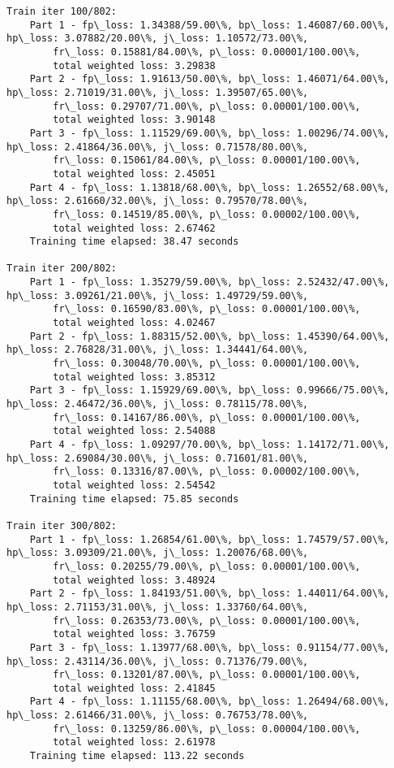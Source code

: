 \documentclass[11pt]{article}
\begin{document}
\begin{Verbatim}[commandchars=\\\{\}]
Train iter 100/802:
	Part 1 - fp\_loss: 1.34388/59.00\%, bp\_loss: 1.46087/60.00\%, hp\_loss: 3.07882/20.00\%, j\_loss: 1.10572/73.00\%, 
		fr\_loss: 0.15881/84.00\%, p\_loss: 0.00001/100.00\%, 
		total weighted loss: 3.29838
	Part 2 - fp\_loss: 1.91613/50.00\%, bp\_loss: 1.46071/64.00\%, hp\_loss: 2.71019/31.00\%, j\_loss: 1.39507/65.00\%, 
		fr\_loss: 0.29707/71.00\%, p\_loss: 0.00001/100.00\%, 
		total weighted loss: 3.90148
	Part 3 - fp\_loss: 1.11529/69.00\%, bp\_loss: 1.00296/74.00\%, hp\_loss: 2.41864/36.00\%, j\_loss: 0.71578/80.00\%, 
		fr\_loss: 0.15061/84.00\%, p\_loss: 0.00001/100.00\%, 
		total weighted loss: 2.45051
	Part 4 - fp\_loss: 1.13818/68.00\%, bp\_loss: 1.26552/68.00\%, hp\_loss: 2.61660/32.00\%, j\_loss: 0.79570/78.00\%, 
		fr\_loss: 0.14519/85.00\%, p\_loss: 0.00002/100.00\%, 
		total weighted loss: 2.67462
	Training time elapsed: 38.47 seconds

Train iter 200/802:
	Part 1 - fp\_loss: 1.35279/59.00\%, bp\_loss: 2.52432/47.00\%, hp\_loss: 3.09261/21.00\%, j\_loss: 1.49729/59.00\%, 
		fr\_loss: 0.16590/83.00\%, p\_loss: 0.00001/100.00\%, 
		total weighted loss: 4.02467
	Part 2 - fp\_loss: 1.88315/52.00\%, bp\_loss: 1.45390/64.00\%, hp\_loss: 2.76828/31.00\%, j\_loss: 1.34441/64.00\%, 
		fr\_loss: 0.30048/70.00\%, p\_loss: 0.00001/100.00\%, 
		total weighted loss: 3.85312
	Part 3 - fp\_loss: 1.15929/69.00\%, bp\_loss: 0.99666/75.00\%, hp\_loss: 2.46472/36.00\%, j\_loss: 0.78115/78.00\%, 
		fr\_loss: 0.14167/86.00\%, p\_loss: 0.00001/100.00\%, 
		total weighted loss: 2.54088
	Part 4 - fp\_loss: 1.09297/70.00\%, bp\_loss: 1.14172/71.00\%, hp\_loss: 2.69084/30.00\%, j\_loss: 0.71601/81.00\%, 
		fr\_loss: 0.13316/87.00\%, p\_loss: 0.00002/100.00\%, 
		total weighted loss: 2.54542
	Training time elapsed: 75.85 seconds

Train iter 300/802:
	Part 1 - fp\_loss: 1.26854/61.00\%, bp\_loss: 1.74579/57.00\%, hp\_loss: 3.09309/21.00\%, j\_loss: 1.20076/68.00\%, 
		fr\_loss: 0.20255/79.00\%, p\_loss: 0.00001/100.00\%, 
		total weighted loss: 3.48924
	Part 2 - fp\_loss: 1.84193/51.00\%, bp\_loss: 1.44011/64.00\%, hp\_loss: 2.71153/31.00\%, j\_loss: 1.33760/64.00\%, 
		fr\_loss: 0.26353/73.00\%, p\_loss: 0.00001/100.00\%, 
		total weighted loss: 3.76759
	Part 3 - fp\_loss: 1.13977/68.00\%, bp\_loss: 0.91154/77.00\%, hp\_loss: 2.43114/36.00\%, j\_loss: 0.71376/79.00\%, 
		fr\_loss: 0.13201/87.00\%, p\_loss: 0.00001/100.00\%, 
		total weighted loss: 2.41845
	Part 4 - fp\_loss: 1.11155/68.00\%, bp\_loss: 1.26494/68.00\%, hp\_loss: 2.61466/31.00\%, j\_loss: 0.76753/78.00\%, 
		fr\_loss: 0.13259/86.00\%, p\_loss: 0.00004/100.00\%, 
		total weighted loss: 2.61978
	Training time elapsed: 113.22 seconds


\end{Verbatim}
\end{document}
